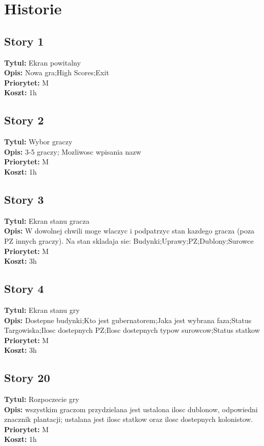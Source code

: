 \documentclass[12pt]{article}
\begin{document}
\section{Historie}

\subsection{Story 1}
\textbf{Tytul:} Ekran powitalny \\
\textbf{Opis:} Nowa gra;High Scores;Exit \\
\textbf{Priorytet:} M \\
\textbf{Koszt:} 1h \\

\subsection{Story 2}
\textbf{Tytul:} Wybor graczy \\
\textbf{Opis:} 3-5 graczy; Mozliwosc wpisania nazw \\
\textbf{Priorytet:} M \\
\textbf{Koszt:} 1h \\

\subsection{Story 3}
\textbf{Tytul:} Ekran stanu gracza \\
\textbf{Opis:} W dowolnej chwili moge wlaczyc i podpatrzyc stan kazdego gracza
(poza PZ innych graczy). Na stan skladaja sie: Budynki;Uprawy;PZ;Dublony;Surowce \\
\textbf{Priorytet:} M \\
\textbf{Koszt:} 3h \\

\subsection{Story 4}
\textbf{Tytul:} Ekran stanu gry \\
\textbf{Opis:} Dostepne budynki;Kto jest gubernatorem;Jaka jest wybrana
faza;Status Targowiska;Ilosc dostepnych PZ;Ilosc dostepnych typow
surowcow;Status statkow \\
\textbf{Priorytet:} M \\
\textbf{Koszt:} 3h \\

\subsection{Story 20}
\textbf{Tytul:} Rozpoczecie gry \\
\textbf{Opis:} wszystkim graczom przydzielana jest ustalona ilosc dublonow, odpowiedni
znacznik plantacji; ustalana jest ilosc statkow oraz ilosc dostepnych
kolonistow. \\
\textbf{Priorytet:} M \\
\textbf{Koszt:} 1h \\
\end{document}
